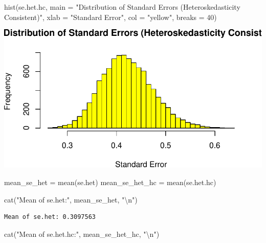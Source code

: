 \documentclass[
  11pt,
]{article}
\newenvironment{Shaded}{\begin{snugshade}}{\end{snugshade}}
\newcommand{\AttributeTok}[1]{\textcolor[rgb]{0.40,0.45,0.13}{#1}}
\newcommand{\DecValTok}[1]{\textcolor[rgb]{0.68,0.00,0.00}{#1}}
\newcommand{\FunctionTok}[1]{\textcolor[rgb]{0.28,0.35,0.67}{#1}}
\newcommand{\NormalTok}[1]{\textcolor[rgb]{0.00,0.23,0.31}{#1}}
\newcommand{\OtherTok}[1]{\textcolor[rgb]{0.00,0.23,0.31}{#1}}
\newcommand{\SpecialCharTok}[1]{\textcolor[rgb]{0.37,0.37,0.37}{#1}}
\newcommand{\StringTok}[1]{\textcolor[rgb]{0.13,0.47,0.30}{#1}}
\begin{document}
\begin{Shaded}
\begin{Highlighting}[]
\FunctionTok{hist}\NormalTok{(se.het.hc, }\AttributeTok{main =} \StringTok{"Distribution of Standard Errors (Heteroskedasticity Consistent)"}\NormalTok{, }\AttributeTok{xlab =} \StringTok{"Standard Error"}\NormalTok{, }\AttributeTok{col =} \StringTok{"yellow"}\NormalTok{, }\AttributeTok{breaks =} \DecValTok{40}\NormalTok{)}
\end{Highlighting}
\end{Shaded}

\includegraphics{HW-4-CODE-and-ANSWERS_files/figure-pdf/unnamed-chunk-20-2.pdf}

\begin{Shaded}
\begin{Highlighting}[]
\NormalTok{mean\_se\_het }\OtherTok{=} \FunctionTok{mean}\NormalTok{(se.het)}
\NormalTok{mean\_se\_het\_hc }\OtherTok{=} \FunctionTok{mean}\NormalTok{(se.het.hc)}

\FunctionTok{cat}\NormalTok{(}\StringTok{"Mean of se.het:"}\NormalTok{, mean\_se\_het, }\StringTok{"}\SpecialCharTok{\textbackslash{}n}\StringTok{"}\NormalTok{)}
\end{Highlighting}
\end{Shaded}

\begin{verbatim}
Mean of se.het: 0.3097563 
\end{verbatim}

\begin{Shaded}
\begin{Highlighting}[]
\FunctionTok{cat}\NormalTok{(}\StringTok{"Mean of se.het.hc:"}\NormalTok{, mean\_se\_het\_hc, }\StringTok{"}\SpecialCharTok{\textbackslash{}n}\StringTok{"}\NormalTok{)}
\end{Highlighting}
\end{Shaded}
\end{document}
